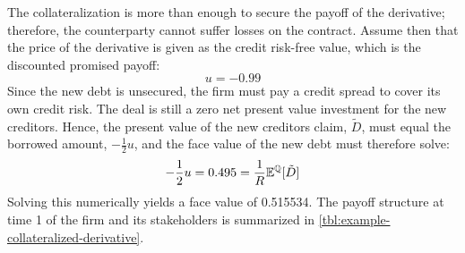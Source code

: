 \documentclass[main.tex]{subfiles}
\begin{document}
        The collateralization is more than enough to secure the payoff of the derivative;
        therefore, the counterparty cannot suffer losses on the contract.
        Assume then that the price of the derivative is given as the credit risk-free
        value, which is the discounted promised payoff:
            \begin{equation*}
                u = \num{-0.99}
            \end{equation*}
        Since the new debt is unsecured, 
        the firm must pay a credit spread to cover its own credit risk. 
        The deal is still a zero net present value investment for the new creditors.
        Hence, the present value of the new creditors claim, $\tilde{D}$, 
        must equal the borrowed amount, $- \frac{1}{2}u$,
        and the face value of the new debt must therefore solve:
            \begin{equation*}
                -
                \frac{1}{2} 
                u
                = 
                \num{0.495}
                =
                \frac{1}{R}
                \mathbb{E}^{\mathbb{Q}}[\tilde{D}]
            \end{equation*}
        Solving this numerically yields a face value of \num{0.515534}.
        The payoff structure at time 1 of the firm and its stakeholders
        is summarized in \cref{tbl:example-collateralized-derivative}.
\end{document}
